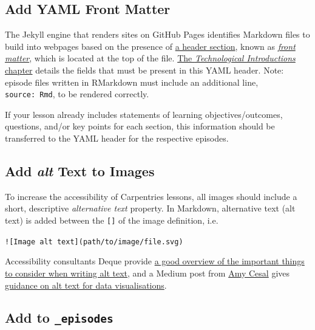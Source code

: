 \documentclass[
]{book}
\begin{document}
\hypertarget{add-yaml-front-matter}{%
\subsection{Add YAML Front Matter}\label{add-yaml-front-matter}}

The Jekyll engine that renders sites on GitHub Pages
identifies Markdown files to build into webpages based on the presence of
\href{https://carpentries.github.io/lesson-example/04-formatting/index.html\#episode-header}{a header section},
known as \href{https://jekyllrb.com/docs/front-matter/}{\emph{front matter}},
which is located at the top of the file.
\href{https://cdh.carpentries.org/technological-introductions.html\#episode-files}{The \emph{Technological Introductions} chapter}
details the fields that must be present in this YAML header.
Note: episode files written in RMarkdown must include an additional line,
\texttt{source:\ Rmd}, to be rendered correctly.

If your lesson already includes statements of learning objectives/outcomes,
questions, and/or key points for each section,
this information should be transferred to the YAML header
for the respective episodes.

\hypertarget{add-alt-text-to-images}{%
\subsection{\texorpdfstring{Add \emph{alt} Text to Images}{Add alt Text to Images}}\label{add-alt-text-to-images}}

To increase the accessibility of Carpentries lessons,
all images should include a short, descriptive \emph{alternative text} property.
In Markdown, alternative text (alt text) is added between the \texttt{{[}{]}} of the
image definition, i.e.

\texttt{!{[}Image\ alt\ text{]}(path/to/image/file.svg)}

Accessibility consultants Deque provide
\href{https://www.deque.com/blog/great-alt-text-introduction/}{a good overview of the important things to consider when writing alt text},
and a Medium post from \href{https://twitter.com/AmyCesal}{Amy Cesal} gives
\href{https://medium.com/nightingale/writing-alt-text-for-data-visualization-2a218ef43f81}{guidance on alt text for data visualisations}.

\hypertarget{add-to-_episodes}{%
\subsection{\texorpdfstring{Add to \texttt{\_episodes}}{Add to \_episodes}}\label{add-to-_episodes}}
\end{document}
